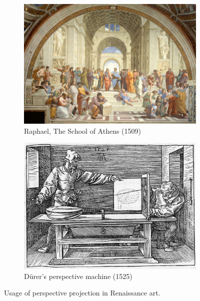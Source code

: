 \begin{figure}[h]
\centering
\begin{subfigure}[b]{0.48\textwidth}
	\includegraphics[width=\textwidth]{assets/img/raphael_school_athens.jpg}
	\caption{Raphael, The School of Athens (1509)}%
	\label{fig:raphael_school_athens}
\end{subfigure}
\hfill
\begin{subfigure}[b]{0.46\textwidth}
	\includegraphics[width=\textwidth]{assets/img/durer_perspective_machine.jpg}
	\caption{D\"urer's perspective machine (1525)}%
	\label{fig:durer_perspective_machine}
\end{subfigure}
\caption{Usage of perspective projection in Renaissance art.}%
\end{figure}

